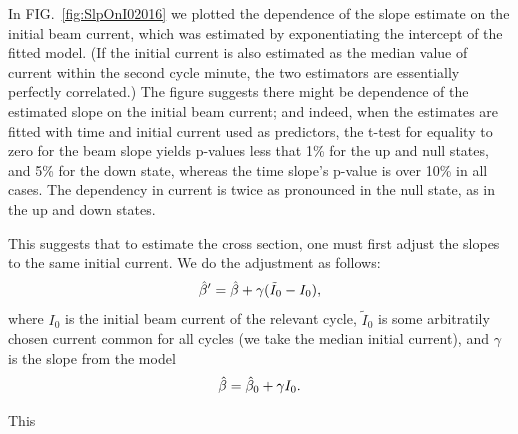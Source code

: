 \documentclass[reprint]{revtex4-1}
\begin{document}
In FIG.~\ref{fig:SlpOnI02016} we plotted the dependence of the slope estimate on the initial beam current, which was estimated by exponentiating the intercept of the fitted model. (If the initial current is also estimated as the median value of current within the second cycle minute, the two estimators are essentially perfectly correlated.) The figure suggests there might be dependence of the estimated slope on the initial beam current; and indeed, when the estimates are fitted with time and initial current used as predictors, the t-test for equality to zero for the beam slope yields p-values less that 1\% for the up and null states, and 5\% for the down state, whereas the time slope's p-value is over 10\% in all cases. The dependency in current is twice as pronounced in the null state, as in the up and down states.

This suggests that to estimate the cross section, one must first adjust the slopes to the same initial current. We do the adjustment as follows:
\[
	\slp*' = \slp* + \gamma(\tilde I_0 - I_0),
\]
where $I_0$ is the initial beam current of the relevant cycle, $\tilde I_0$ is some arbitratily chosen current common for all cycles (we take the median initial current), and $\gamma$ is the slope from the model
\[
	\slp* = \slp*[0] + \gamma I_0.
\]
 
This 
\end{document}
